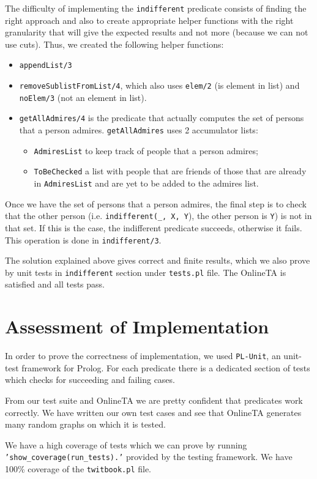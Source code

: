 \documentclass{article}
\begin{document}
The difficulty of implementing the \texttt{indifferent} predicate consists of finding the right approach and also to create appropriate helper functions with the right granularity that will give the expected results and not more (because we can not use cuts). Thus, we created the following helper functions:
\begin{itemize}
	\item \texttt{appendList/3}
	\item \texttt{removeSublistFromList/4}, which also uses
	\texttt{elem/2} (is element in list) and  \texttt{noElem/3} (not an element in list).
	\item \texttt{getAllAdmires/4} is the predicate that actually computes the set of persons that a person admires. \texttt{getAllAdmires} uses 2 accumulator lists:
	\begin{itemize}
		\item \texttt{AdmiresList} to keep track of people that a person admires;
		\item \texttt{ToBeChecked} a list with people that are friends of those that are already in \texttt{AdmiresList} and are yet to be added to the admires list.
	\end{itemize} 
\end{itemize} 

Once we have the set of persons that a person admires, the final step is to check that the other person (i.e. \texttt{indifferent(\_, X, Y}), the other person is \texttt{Y}) is not in that set. If this is the case, the indifferent predicate succeeds, otherwise it fails. This operation is done in \texttt{indifferent/3}.

The solution explained above gives correct and finite results, which we also prove by unit tests in \texttt{indifferent} section under \texttt{tests.pl} file. The OnlineTA is satisfied and all tests pass.


\section{Assessment of Implementation}
In order to prove the correctness of implementation, we used \texttt{PL-Unit}, an unit-test framework for Prolog. For each predicate there is a dedicated section of tests which checks for succeeding and failing cases.

From our test suite and OnlineTA we are pretty confident that predicates work correctly. We have written our own test cases and see that OnlineTA generates many random graphs on which it is tested.

We have a high coverage of tests which we can prove by running \texttt{'show\_coverage(run\_tests).'} provided by the testing framework. We have 100\% coverage of the \texttt{twitbook.pl} file.
\end{document}
